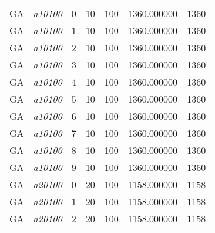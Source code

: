 {\begin{longtable}{cc|c|cc|cc}
			GA                 & \textit{a10100}    & 0                               & 10               & 100              & 1360.000000                          & 1360 \\  
			GA                 & \textit{a10100}    & 1                               & 10               & 100              & 1360.000000                          & 1360 \\  
			GA                 & \textit{a10100}    & 2                               & 10               & 100              & 1360.000000                          & 1360 \\  
			GA                 & \textit{a10100}    & 3                               & 10               & 100              & 1360.000000                          & 1360 \\  
			GA                 & \textit{a10100}    & 4                               & 10               & 100              & 1360.000000                          & 1360 \\  
			GA                 & \textit{a10100}    & 5                               & 10               & 100              & 1360.000000                          & 1360 \\  
			GA                 & \textit{a10100}    & 6                               & 10               & 100              & 1360.000000                          & 1360 \\  
			GA                 & \textit{a10100}    & 7                               & 10               & 100              & 1360.000000                          & 1360 \\  
			GA                 & \textit{a10100}    & 8                               & 10               & 100              & 1360.000000                          & 1360 \\  
			GA                 & \textit{a10100}    & 9                               & 10               & 100              & 1360.000000                          & 1360 \\  \hline
			GA                 & \textit{a20100}    & 0                               & 20               & 100              & 1158.000000                          & 1158 \\  
			GA                 & \textit{a20100}    & 1                               & 20               & 100              & 1158.000000                          & 1158 \\  
			GA                 & \textit{a20100}    & 2                               & 20               & 100              & 1158.000000                          & 1158 \\  

\end{longtable}}
